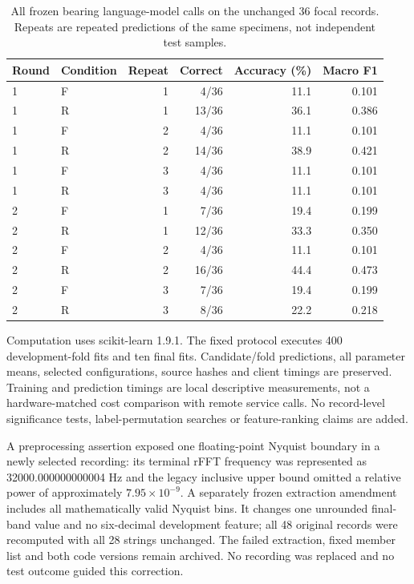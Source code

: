 \documentclass[11pt,a4paper]{article}
\begin{document}
\FloatBarrier

\begin{table}[htbp]\centering\small
\caption{All frozen bearing language-model calls on the unchanged 36 focal records. Repeats are repeated predictions of the same specimens, not independent test samples.}
\label{tab:bearing_llm_calls}
\begin{tabular}{@{}llrrrr@{}}\toprule
Round & Condition & Repeat & Correct & Accuracy (\%) & Macro F1 \\\midrule
1 & F & 1 & 4/36 & 11.1 & 0.101 \\
1 & R & 1 & 13/36 & 36.1 & 0.386 \\
1 & F & 2 & 4/36 & 11.1 & 0.101 \\
1 & R & 2 & 14/36 & 38.9 & 0.421 \\
1 & F & 3 & 4/36 & 11.1 & 0.101 \\
1 & R & 3 & 4/36 & 11.1 & 0.101 \\
2 & F & 1 & 7/36 & 19.4 & 0.199 \\
2 & R & 1 & 12/36 & 33.3 & 0.350 \\
2 & F & 2 & 4/36 & 11.1 & 0.101 \\
2 & R & 2 & 16/36 & 44.4 & 0.473 \\
2 & F & 3 & 7/36 & 19.4 & 0.199 \\
2 & R & 3 & 8/36 & 22.2 & 0.218 \\
\bottomrule\end{tabular}
\end{table}

Computation uses scikit-learn 1.9.1. The fixed protocol executes 400 development-fold fits and ten final fits. Candidate/fold predictions, all parameter means, selected configurations, source hashes and client timings are preserved. Training and prediction timings are local descriptive measurements, not a hardware-matched cost comparison with remote service calls. No record-level significance tests, label-permutation searches or feature-ranking claims are added.

A preprocessing assertion exposed one floating-point Nyquist boundary in a newly selected recording: its terminal rFFT frequency was represented as 32000.000000000004 Hz and the legacy inclusive upper bound omitted a relative power of approximately $7.95\times10^{-9}$. A separately frozen extraction amendment includes all mathematically valid Nyquist bins. It changes one unrounded final-band value and no six-decimal development feature; all 48 original records were recomputed with all 28 strings unchanged. The failed extraction, fixed member list and both code versions remain archived. No recording was replaced and no test outcome guided this correction.
\end{document}
